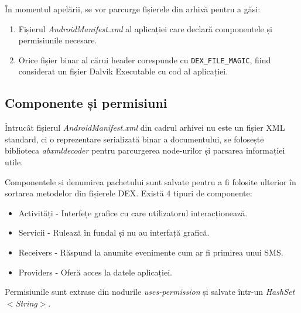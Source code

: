 \documentclass[12pt,a4paper]{report}
\begin{document}
În momentul apelării, se vor parcurge fișierele din arhivă pentru a găsi:
\begin{enumerate}
      \item Fișierul \textit{AndroidManifest.xml} al aplicației care declară componentele și permisiunile necesare.
      \item Orice fișier binar al cărui header corespunde cu \texttt{DEX\_FILE\_MAGIC}\cite{dex-format},
            fiind considerat un fișier Dalvik Executable cu cod al aplicației.
\end{enumerate}

\subsection{Componente și permisiuni}
Întrucât fișierul \textit{AndroidManifest.xml} din cadrul arhivei nu este un fișier XML standard,
ci o reprezentare serializată binar a documentului, se folosește biblioteca \textit{abxmldecoder}\cite{abxmldecoder}
pentru parcurgerea node-urilor și parsarea informației utile.

Componentele și denumirea pachetului sunt salvate pentru a fi folosite ulterior în sortarea metodelor din fișierele DEX. Există 4 tipuri de componente:
\begin{itemize}
      \item Activități - Interfețe grafice cu care utilizatorul interacționează.
      \item Servicii - Rulează în fundal și nu au interfață grafică.
      \item Receivers - Răspund la anumite evenimente cum ar fi primirea unui SMS.
      \item Providers - Oferă acces la datele aplicației.
\end{itemize}

Permisiunile sunt extrase din nodurile \textit{uses-permission} și salvate într-un \textit{HashSet$<$String$>$}.
\end{document}
